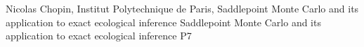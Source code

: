 {}	%
{}		%
{Nicolas Chopin, Institut Polytechnique de Paris, Saddlepoint Monte Carlo and its application to exact ecological inference}	%
{Saddlepoint Monte Carlo and its application to exact ecological inference}		%
{P7}		%
\\\hline

